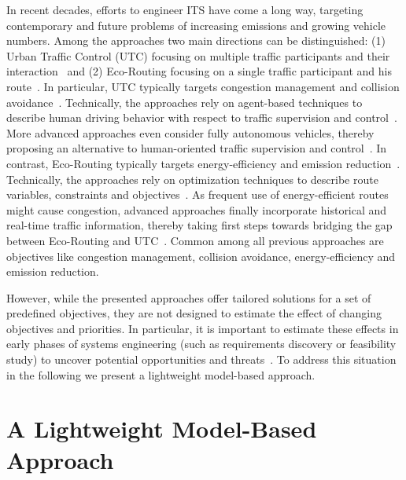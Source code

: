 \documentclass[conference]{../cls/IEEEtran}
\begin{document}
In recent decades, efforts to engineer ITS have come a long way, targeting contemporary and future problems of increasing emissions and growing vehicle numbers. Among the approaches two main directions can be distinguished: (1) Urban Traffic Control (UTC) focusing on multiple traffic participants and their interaction~\cite{Chen2010,Dresner2008} and (2) Eco-Routing focusing on a single traffic participant and his route~\cite{Ericsson2006,Boriboonsomsin2012}. In particular, UTC typically targets congestion management and collision avoidance~\cite{Chen2010}. Technically, the approaches rely on agent-based techniques to describe human driving behavior with respect to traffic supervision and control~\cite{Chen2010}. More advanced approaches even consider fully autonomous vehicles, thereby proposing an alternative to human-oriented traffic supervision and control~\cite{Dresner2008}. In contrast, Eco-Routing typically targets energy-efficiency and emission reduction~\cite{Ericsson2006}. Technically, the approaches rely on optimization techniques to describe route variables, constraints and objectives~\cite{Ericsson2006}. As frequent use of energy-efficient routes might cause congestion, advanced approaches finally incorporate historical and real-time traffic information, thereby taking first steps towards bridging the gap between Eco-Routing and UTC~\cite{Boriboonsomsin2012}. Common among all previous approaches are objectives like congestion management, collision avoidance, energy-efficiency and emission reduction.

However, while the presented approaches offer tailored solutions for a set of predefined objectives, they are not designed to estimate the effect of changing objectives and priorities. In particular, it is important to estimate these effects in early phases of systems engineering (such as requirements discovery or feasibility study) to uncover potential opportunities and threats~\cite{Whitten2005}. To address this situation in the following we present a lightweight model-based approach.

\section{A Lightweight Model-Based Approach}
\label{sec:approach}
\end{document}
